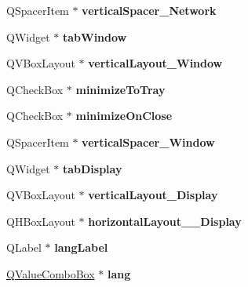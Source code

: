 \begin{DoxyCompactItemize}
Q\+Spacer\+Item $\ast$ {\bfseries vertical\+Spacer\+\_\+\+Network}
\item 
\mbox{\label{class_ui___options_dialog_a1b902f35b78a17f4f0ae121760ad4b2c}} 
Q\+Widget $\ast$ {\bfseries tab\+Window}
\item 
\mbox{\label{class_ui___options_dialog_a1791b07b6697b7f04525d1905b60de46}} 
Q\+V\+Box\+Layout $\ast$ {\bfseries vertical\+Layout\+\_\+\+Window}
\item 
\mbox{\label{class_ui___options_dialog_a47833c7b4473efc07e09af712f614b67}} 
Q\+Check\+Box $\ast$ {\bfseries minimize\+To\+Tray}
\item 
\mbox{\label{class_ui___options_dialog_af2bd7194065c7167c1c7c7c2476a0008}} 
Q\+Check\+Box $\ast$ {\bfseries minimize\+On\+Close}
\item 
\mbox{\label{class_ui___options_dialog_a29740518c1eb6a6ab3ab2ba45ac74afd}} 
Q\+Spacer\+Item $\ast$ {\bfseries vertical\+Spacer\+\_\+\+Window}
\item 
\mbox{\label{class_ui___options_dialog_a84a3aa23bc2d43996d7a609795520fee}} 
Q\+Widget $\ast$ {\bfseries tab\+Display}
\item 
\mbox{\label{class_ui___options_dialog_a34225a7e9df1eb7627e8b8c0a9b281f3}} 
Q\+V\+Box\+Layout $\ast$ {\bfseries vertical\+Layout\+\_\+\+Display}
\item 
\mbox{\label{class_ui___options_dialog_a47e4724075cdedaec82cdd3baeffc353}} 
Q\+H\+Box\+Layout $\ast$ {\bfseries horizontal\+Layout\+\_\+\_\+\+Display}
\item 
\mbox{\label{class_ui___options_dialog_ad0e1b9bf49a3689dd1fa58904be0d2ed}} 
Q\+Label $\ast$ {\bfseries lang\+Label}
\item 
\mbox{\label{class_ui___options_dialog_a09c441976d9b1dd4607170990a8dc697}} 
\mbox{\hyperlink{class_q_value_combo_box}{Q\+Value\+Combo\+Box}} $\ast$ {\bfseries lang}

\end{DoxyCompactItemize}
